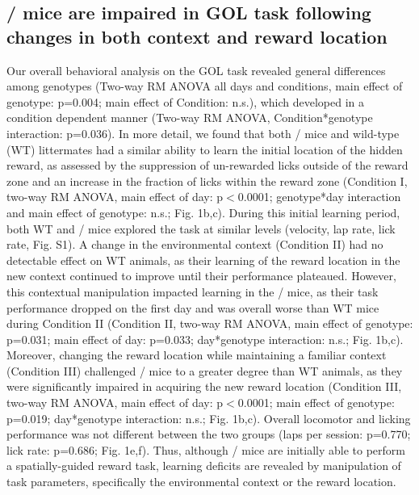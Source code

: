 \subsection{\df/ mice are impaired in GOL task following changes in both context and reward location}

Our overall behavioral analysis on the GOL task revealed general differences among genotypes (Two-way RM ANOVA all days and conditions, main effect of genotype: p=0.004; main effect of Condition: n.s.), which developed in a condition dependent manner (Two-way RM ANOVA, Condition*genotype interaction: p=0.036). In more detail, we found that both \df/ mice and wild-type (WT) littermates had a similar ability to learn the initial location of the hidden reward, as assessed by the suppression of un-rewarded licks outside of the reward zone and an increase in the fraction of licks within the reward zone (Condition I, two-way RM ANOVA, main effect of day: p$<$0.0001; genotype*day interaction and main effect of genotype: n.s.; Fig. 1b,c). During this initial learning period, both WT and \df/ mice explored the task at similar levels (velocity, lap rate, lick rate, Fig. S1). A change in the environmental context (Condition II) had no detectable effect on WT animals, as their learning of the reward location in the new context continued to improve until their performance plateaued. However, this contextual manipulation impacted learning in the \df/ mice, as their task performance dropped on the first day and was overall worse than WT mice during Condition II (Condition II, two-way RM ANOVA, main effect of genotype: p=0.031; main effect of day: p=0.033; day*genotype interaction: n.s.; Fig. 1b,c). Moreover, changing the reward location while maintaining a familiar context (Condition III) challenged \df/ mice to a greater degree than WT animals, as they were significantly impaired in acquiring the new reward location (Condition III, two-way RM ANOVA, main effect of day: p$<$0.0001; main effect of genotype: p=0.019; day*genotype interaction: n.s.; Fig. 1b,c). Overall locomotor and licking performance was not different between the two groups (laps per session: p=0.770; lick rate: p=0.686; Fig. 1e,f). Thus, although \df/ mice are initially able to perform a spatially-guided reward task, learning deficits are revealed by manipulation of task parameters, specifically the environmental context or the reward location.

